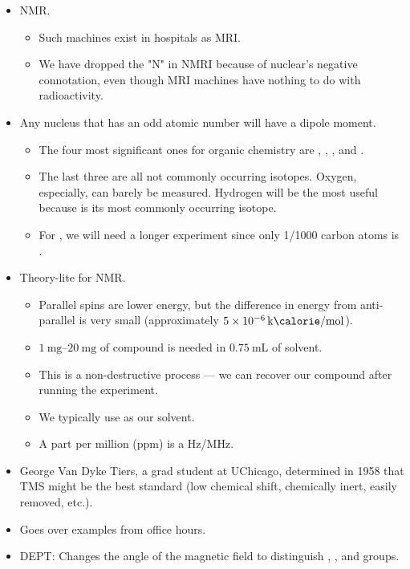 \documentclass[../notes.tex]{subfiles}
\begin{document}
\begin{itemize}
    \item NMR.
    \begin{itemize}
        \item Such machines exist in hospitals as MRI.
        \item We have dropped the "N" in NMRI because of nuclear's negative connotation, even though MRI machines have nothing to do with radioactivity.
    \end{itemize}
    \item Any nucleus that has an odd atomic number will have a dipole moment.
    \begin{itemize}
        \item The four most significant ones for organic chemistry are , , , and .
        \item The last three are all not commonly occurring isotopes. Oxygen, especially, can barely be measured. Hydrogen will be the most useful because  is its most commonly occurring isotope.
        \item For , we will need a longer experiment since only 1/1000 carbon atoms is .
    \end{itemize}
    \item Theory-lite for NMR.
    \begin{itemize}
        \item Parallel spins are lower energy, but the difference in energy from anti-parallel is very small (approximately $\SI[per-mode=symbol]{5e-6}{\kilo\calorie\per\mole}$).
        \item $\SIrange{1}{20}{\milli\gram}$ of compound is needed in $\SI{0.75}{\milli\liter}$ of solvent.
        \item This is a non-destructive process --- we can recover our compound after running the experiment.
        \item We typically use  as our solvent.
        \item A part per million (ppm) is a Hz/MHz.
    \end{itemize}
    \item George Van Dyke Tiers, a grad student at UChicago, determined in 1958 that TMS might be the best standard (low chemical shift, chemically inert, easily removed, etc.).
    \item Goes over examples from office hours.
    \item DEPT: Changes the angle of the magnetic field to distinguish , , and  groups.

\end{itemize}
\end{document}
